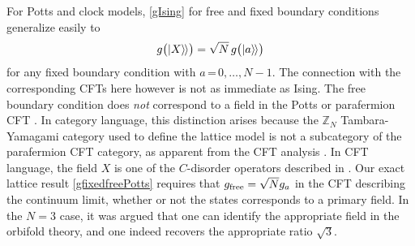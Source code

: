 For Potts and clock models, \eqref{gIsing} for free and fixed boundary conditions generalize easily to
\begin{align}
g\big({|{X}\rangle\mkern-2mu\rangle}\big)=\sqrt{N}\, g\big({|{a}\rangle\mkern-2mu\rangle}\big)
\label{gfixedfreePotts}
\end{align}
for any fixed boundary condition with $a\,$=$\,0,\dots, N-1$. The connection with the corresponding CFTs here however is not as immediate as Ising. The free boundary condition does {\em not} correspond to a field in the Potts or parafermion CFT \cite{Cardy1989}. In category language, this distinction arises because the $\mathbb{Z}_N$ Tambara-Yamagami category used to define the lattice model is not a subcategory of the parafermion CFT category, as apparent from the CFT analysis \cite{ZamoFateev:Parafermion:85}. In CFT language, the field $X$ is one of the $C$-disorder operators described in \cite{Zamolodchikov86}. Our exact lattice result \eqref{gfixedfreePotts} requires that $g_{\rm free} = \sqrt{N} g_{a}$ in the CFT describing the continuum limit, whether or not the states corresponds to a primary field. In the $N=3$ case, it was argued  \cite{Affleck1998} that one can identify the appropriate field in the orbifold theory, and one indeed recovers the appropriate ratio $\sqrt{3}$. 

